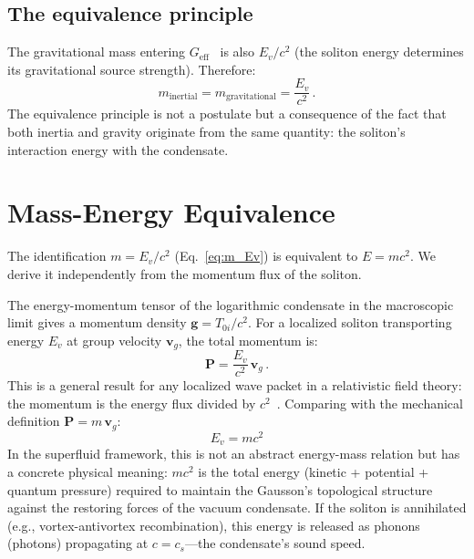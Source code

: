 \documentclass[12pt, a4paper]{article}
\newcommand{\Geff}{G_{\mathrm{eff}}}
\begin{document}
\subsection{The equivalence principle}

The gravitational mass entering
$\Geff$~\cite{kulangiev_gravity} is also $E_v/c^2$
(the soliton energy determines its gravitational
source strength). Therefore:
\begin{equation}
    m_{\mathrm{inertial}} = m_{\mathrm{gravitational}}
    = \frac{E_v}{c^2}\,.
\label{eq:equivalence}
\end{equation}
The equivalence principle is not a postulate but a
consequence of the fact that both inertia and gravity
originate from the same quantity: the soliton's
interaction energy with the condensate.


\section{Mass-Energy Equivalence}
\label{sec:mass_energy}

The identification $m = E_v/c^2$
(Eq.~\ref{eq:m_Ev}) is equivalent to $E = mc^2$.
We derive it independently from the momentum flux
of the soliton.

The energy-momentum tensor of the logarithmic
condensate in the macroscopic limit gives a momentum
density $\mathbf{g} = T_{0i}/c^2$. For a localized
soliton transporting energy $E_v$ at group velocity
$\mathbf{v}_g$, the total momentum is:
\begin{equation}
    \mathbf{P} = \frac{E_v}{c^2}\,\mathbf{v}_g\,.
\label{eq:P_wave}
\end{equation}
This is a general result for any localized wave
packet in a relativistic field theory: the momentum
is the energy flux divided by
$c^2$~\cite{jackson_1999}. Comparing with the
mechanical definition
$\mathbf{P} = m\,\mathbf{v}_g$:
\begin{equation}
    \boxed{\;E_v = mc^2\;}
\label{eq:emc2}
\end{equation}
In the superfluid framework, this is not an
abstract energy-mass relation but has a concrete
physical meaning: $mc^2$ is the total energy
(kinetic + potential + quantum pressure) required to
maintain the Gausson's topological structure against
the restoring forces of the vacuum condensate. If
the soliton is annihilated (e.g., vortex-antivortex
recombination), this energy is released as phonons
(photons) propagating at $c = c_s$---the condensate's
sound speed.
\end{document}
